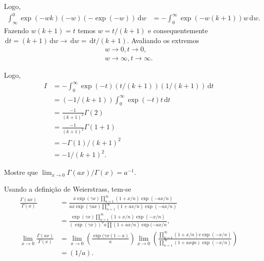 \documentclass[a4paper,12pt, leqno, answers]{exam}
\begin{document}
\begin{questions}
\begin{parts}
\begin{solution}
            Logo,
            \begin{align*}
                \int_\infty^0 \exp \left( -w k \right) \left( -w \right) \left( -\exp \left( -w \right) \right) \,\mathrm{d}w &= - \int_0^\infty \exp \left( -w \left( k + 1 \right) \right) w \,\mathrm{d}w.
            \end{align*}
            Fazendo $w \left( k + 1 \right) = t$ temos $w = t / \left( k + 1 \right)$ e consequentemente $\,\mathrm{d}t = \left( k + 1 \right) \,\mathrm{d}w \to \,\mathrm{d}w = \,\mathrm{d}t / \left( k + 1 \right)$. Avaliando os extremos
            \begin{align*}
                w \to 0, t \to 0, \\
                w \to \infty, t \to \infty.
            \end{align*}

            Logo,
            \begin{align*}
                I &= - \int_0^\infty \exp \left( -t \right) \left( t / \left( k + 1 \right) \right) \left( 1 / \left( k + 1 \right) \right) \,\mathrm{d}t \\
                &= \left( -1 / \left( k + 1 \right) \right) \int_0^\infty \exp \left( -t \right) t \,\mathrm{d}t \\
                &= \frac{-1}{\left( k + 1 \right)^2} \Gamma \left( 2 \right) \\
                &= \frac{-1}{\left( k + 1 \right)^2} \Gamma \left( 1 + 1 \right) \\
                &= - \Gamma \left( 1 \right) / \left( k + 1 \right)^2 \\
                &= - 1 / \left( k + 1 \right)^2.
            \end{align*}
        \end{solution}
    \end{parts}

    \question Mostre que $\lim_{x \to 0} \Gamma(a x) / \Gamma(x) = a^{-1}$.
    \begin{solution}
        Usando a defini\c{c}\~{a}o de Weierstrass, tem-se
        \begin{align*}
            \frac{\Gamma(a x)}{\Gamma(x)} &= \frac{x \exp(\gamma x) \prod_{n = 1}^\infty \left( 1 + x / n \right) \exp(-a x / n)}{a x \exp(\gamma a x) \prod_{n = 1}^\infty \left( 1 + a x / n \right) \exp(-a x / n)} \\
            &= \frac{\exp(\gamma x) \prod_{n = 1}^\infty \left( 1 + x / n \right) \exp(-x / n)}{\left( \exp(\gamma x) \right)^a a \prod \left( 1 + a x / n \right) \exp(-a x / n}, \\
            \lim_{x \to 0} \frac{\Gamma(a x)}{\Gamma(x)} &= \lim_{x \to 0} \left( \frac{\exp(\gamma x (1 - a)}{a} \right) \lim_{x \to 0} \left( \frac{\prod_{n = 1}^\infty (1 + x / n)v \exp(- x / n)}{\prod_{n = 1}^\infty (1 + a x q n) \exp(-x / n)} \right) \\
            &= \left( 1 / a \right).
        \end{align*}
    \end{solution}


\end{questions}
\end{document}
